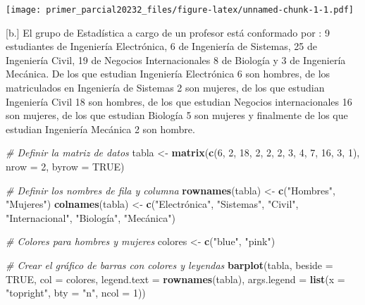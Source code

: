 \documentclass[
]{article}
\newenvironment{Shaded}{\begin{snugshade}}{\end{snugshade}}
\newcommand{\AttributeTok}[1]{\textcolor[rgb]{0.13,0.29,0.53}{#1}}
\newcommand{\CommentTok}[1]{\textcolor[rgb]{0.56,0.35,0.01}{\textit{#1}}}
\newcommand{\ConstantTok}[1]{\textcolor[rgb]{0.56,0.35,0.01}{#1}}
\newcommand{\DecValTok}[1]{\textcolor[rgb]{0.00,0.00,0.81}{#1}}
\newcommand{\FunctionTok}[1]{\textcolor[rgb]{0.13,0.29,0.53}{\textbf{#1}}}
\newcommand{\NormalTok}[1]{#1}
\newcommand{\OtherTok}[1]{\textcolor[rgb]{0.56,0.35,0.01}{#1}}
\newcommand{\StringTok}[1]{\textcolor[rgb]{0.31,0.60,0.02}{#1}}
\begin{document}
\texttt{[image: primer\_parcial20232\_files/figure-latex/unnamed-chunk-1-1.pdf]}

{[}b.{]} El grupo de Estadística a cargo de un profesor está conformado
por : 9 estudiantes de Ingeniería Electrónica, 6 de Ingeniería de
Sistemas, 25 de Ingeniería Civil, 19 de Negocios Internacionales 8 de
Biología y 3 de Ingeniería Mecánica. De los que estudian Ingeniería
Electrónica 6 son hombres, de los matriculados en Ingeniería de Sistemas
2 son mujeres, de los que estudian Ingeniería Civil 18 son hombres, de
los que estudian Negocios internacionales 16 son mujeres, de los que
estudian Biología 5 son mujeres y finalmente de los que estudian
Ingeniería Mecánica 2 son hombre.

\begin{Shaded}
\begin{Highlighting}[]
\CommentTok{\# Definir la matriz de datos}
\NormalTok{tabla }\OtherTok{\textless{}{-}} \FunctionTok{matrix}\NormalTok{(}\FunctionTok{c}\NormalTok{(}\DecValTok{6}\NormalTok{, }\DecValTok{2}\NormalTok{, }\DecValTok{18}\NormalTok{, }\DecValTok{2}\NormalTok{, }\DecValTok{2}\NormalTok{, }\DecValTok{2}\NormalTok{, }\DecValTok{3}\NormalTok{, }\DecValTok{4}\NormalTok{, }\DecValTok{7}\NormalTok{, }\DecValTok{16}\NormalTok{, }\DecValTok{3}\NormalTok{, }\DecValTok{1}\NormalTok{),}
                \AttributeTok{nrow =} \DecValTok{2}\NormalTok{, }\AttributeTok{byrow =} \ConstantTok{TRUE}\NormalTok{)}

\CommentTok{\# Definir los nombres de fila y columna}
\FunctionTok{rownames}\NormalTok{(tabla) }\OtherTok{\textless{}{-}} \FunctionTok{c}\NormalTok{(}\StringTok{"Hombres"}\NormalTok{, }\StringTok{"Mujeres"}\NormalTok{)}
\FunctionTok{colnames}\NormalTok{(tabla) }\OtherTok{\textless{}{-}} \FunctionTok{c}\NormalTok{(}\StringTok{"Electrónica"}\NormalTok{, }\StringTok{"Sistemas"}\NormalTok{, }\StringTok{"Civil"}\NormalTok{, }\StringTok{"Internacional"}\NormalTok{, }\StringTok{"Biología"}\NormalTok{, }\StringTok{"Mecánica"}\NormalTok{)}

\CommentTok{\# Colores para hombres y mujeres}
\NormalTok{colores }\OtherTok{\textless{}{-}} \FunctionTok{c}\NormalTok{(}\StringTok{"blue"}\NormalTok{, }\StringTok{"pink"}\NormalTok{)}

\CommentTok{\# Crear el gráfico de barras con colores y leyendas}
\FunctionTok{barplot}\NormalTok{(tabla, }\AttributeTok{beside =} \ConstantTok{TRUE}\NormalTok{, }\AttributeTok{col =}\NormalTok{ colores,}
        \AttributeTok{legend.text =} \FunctionTok{rownames}\NormalTok{(tabla), }\AttributeTok{args.legend =} \FunctionTok{list}\NormalTok{(}\AttributeTok{x =} \StringTok{"topright"}\NormalTok{, }\AttributeTok{bty =} \StringTok{"n"}\NormalTok{, }\AttributeTok{ncol =} \DecValTok{1}\NormalTok{))}
\end{Highlighting}
\end{Shaded}
\end{document}
